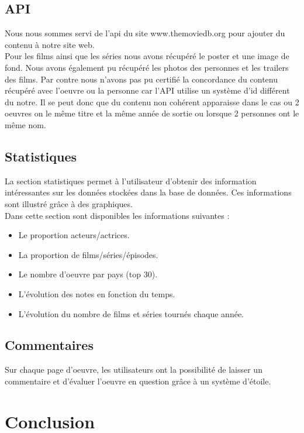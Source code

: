 \documentclass[10pt,a4paper]{article}
\begin{document}
\subsection{API}
Nous nous sommes servi de l'api du site www.themoviedb.org pour ajouter du contenu à notre site web. \\
Pour les films ainsi que les séries nous avons récupéré le poster et une image de fond. Nous avons également pu récupéré les photos des personnes et les trailers des films. Par contre nous n'avons pas pu certifié la concordance du contenu récupéré avec l'oeuvre ou la personne car l'API utilise un système d'id différent du notre. Il se peut donc que du contenu non cohérent apparaisse dans le cas ou 2 oeuvres on le même titre et la même année de sortie ou lorsque 2 personnes ont le même nom.

\newpage
\subsection{Statistiques}
La section statistiques permet à l'utilisateur d'obtenir des information intéressantes sur les données stockées dans la base de données. Ces informations sont illustré grâce à des graphiques. \\

Dans cette section sont disponibles les informations suivantes : 
\vskip 3pt
\begin{itemize}
\item Le proportion acteurs/actrices.
\item La proportion de films/séries/épisodes.
\item Le nombre d'oeuvre par pays (top 30).
\item L'évolution des notes en fonction du temps.
\item L'évolution du nombre de films et séries tournés chaque année.
\end{itemize}

\subsection{Commentaires}
Sur chaque page d'oeuvre, les utilisateurs ont la possibilité de laisser un commentaire et d'évaluer l'oeuvre en question grâce à un système d'étoile.





\section{Conclusion}
\end{document}
